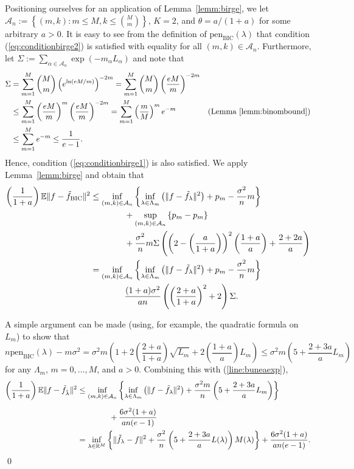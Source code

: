 \documentclass[11pt, letter paper]{article}
\newcommand{\1}{\mathmybb{1}}
\newcommand{\R}{\mathbb{R}}
\newcommand{\0}{\emptyset}
\newcommand{\E}{\mathbb{E}}
\newcommand{\paren}[1]{\left(#1 \right)}
\newcommand{\set}[1]{\left\{ #1 \right\}}
\newcommand{\norm}[1]{|\hspace{-1pt}|#1 |\hspace{-1pt}|}
\newcommand{\normsq}[1]{\norm{#1}^{2}}
\newcommand{\Acal}{\mathcal{A}_{n}}
\newcommand{\ftilde}[1]{\tilde{f}_{#1}}
\newcommand{\lambdahat}[1]{\hat{\lambda}_{#1}}
\newcommand{\penBIC}[1]{\mathrm{pen}_{\mathrm{BIC}}\paren{#1}}
\begin{document}
\begin{myproofbox}
    Positioning ourselves for an application of Lemma~\ref{lemm:birge}, we let \(\Acal := \set{(m,k):m\leq M, k\leq \binom{M}{m}}\), \(K=2\), and \(\theta = a/(1+a)\) for some arbitrary \(a>0\). It is easy to see from the definition of \(\penBIC{\lambda}\) that condition (\ref{eq:conditionbirge2}) is satisfied with equality for all \((m,k)\in\Acal\).
    Furthermore, let \(\Sigma:=\sum_{\alpha\in\Acal}\exp\paren{-m_{\alpha}L_{\alpha}}\) and note that
    \begin{align}
        \notag\Sigma &= \sum_{m=1}^{M} \binom{M}{m}\paren{e^{\ln\paren{eM/m}}}^{-2m} = \sum_{m=1}^{M} \binom{M}{m}\paren{\frac{eM}{m}}^{-2m}\\
        \notag&\leq \sum_{m=1}^{M}\paren{\frac{eM}{m}}^{m}\paren{\frac{eM}{m}}^{-2m} = \sum_{m=1}^{M}\paren{\frac{m}{M}}^{m}e^{-m}&(\text{Lemma~\ref{lemm:binombound}})\\
        &\leq \sum_{m=1}^{M} e^{-m} \leq \frac{1}{e-1}.\label{line:buneaexp}
    \end{align} 
    Hence, condition (\ref{eq:conditionbirge1}) is also satisfied. We apply Lemma~\ref{lemm:birge} and obtain that
    \begin{align*}
        \paren{\frac{1}{1+a}}\E{\normsq{f - \ftilde{\mathrm{BIC}}}} &\leq 
        \inf_{(m,k)\in\Acal}\set{\inf_{\lambda\in\Lambda_{m}}\paren{\normsq{f - \ftilde{\lambda}}} + p_{m} - \frac{\sigma^2}{n}m}\\
        &\qquad\qquad + \sup_{(m,k)\in\Acal}\set{p_{m} - p_{m}}\\
        &\qquad\qquad + \frac{\sigma^{2}}{n}m\Sigma \paren{\paren{2-\paren{\frac{a}{1+a}}}^{2}{\paren{\frac{1+a}{a}}} + {\frac{2+2a}{a}}}\\
        &= \inf_{(m,k)\in\Acal}\set{\inf_{\lambda\in\Lambda_{m}}\paren{\normsq{f - \ftilde{\lambda}}} + p_{m} - \frac{\sigma^2}{n}m}\\
        &\qquad\qquad \frac{(1+a)\sigma^{2}}{an}\paren{\paren{\frac{2+a}{1+a}}^{2} +2}\Sigma.
    \end{align*}

    A simple argument can be made (using, for example, the quadratic formula on \(L_{m}\)) to show that
    \[n\penBIC{\lambda} - m\sigma^{2} = \sigma^{2}m\paren{1+2\paren{\frac{2+a}{1+a}}\sqrt{L_{m}} + 2\paren{\frac{1+a}{a}}L_{m}}\leq \sigma^{2}m\paren{5 + \frac{2+3a}{a}L_{m}}\]
    for any \(\Lambda_{m}\), \(m=0,\ldots,M\), and \(a>0\). Combining this with (\ref{line:buneaexp}),
    \begin{align*}
        \paren{\frac{1}{1+a}}\E{\normsq{f - \ftilde{\lambdahat{}}}}&\leq \inf_{(m,k)\in\Acal}\set{\inf_{\lambda\in\Lambda_{m}}\paren{\normsq{f - \ftilde{\lambda}}} + \frac{\sigma^{2}m}{n}\paren{5 + \frac{2+3a}{a}L_{m}}}\\[2mm]
        &\qquad\qquad + \frac{6\sigma^{2}{(1+a)}}{an(e-1)}\\
        &= \inf_{\lambda\in\R^{M}}\set{\normsq{\ftilde{\lambda} - f} + \frac{\sigma^{2}}{n}\paren{5+\frac{2+3a}{a}{L(\lambda)}}M(\lambda)} + \frac{6\sigma^{2}{(1+a)}}{an(e-1)}.
    \end{align*}
    \qed{}
\end{myproofbox}
\end{document}
